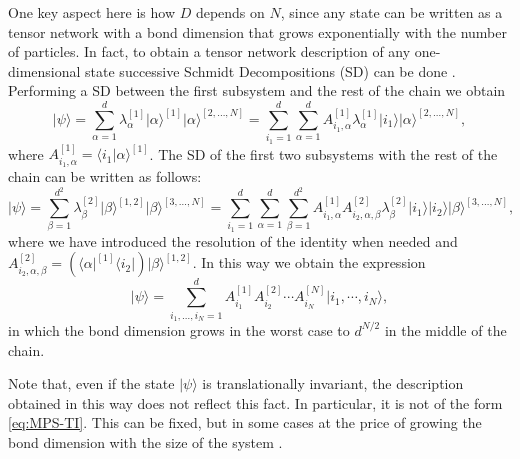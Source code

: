 \documentclass[smallextended]{svjour3}
\renewcommand{\1}{\mathbbm{1}}
\newcommand{\ket} [1] {\vert #1 \rangle}
\newcommand{\bra} [1] {\langle #1 \vert}
\begin{document}
One key aspect here is how $D$ depends on $N$, since any state can be written as a tensor network with a bond dimension that grows exponentially with the number of particles. In fact, to obtain a tensor network description of any one-dimensional state successive Schmidt  Decompositions (SD) can be done \cite{Vidal}. Performing a SD between the first subsystem and the rest of the chain we obtain
$$\ket{\psi}=\sum_{\alpha=1}^d \lambda^{[1]}_{\alpha} \ket{\alpha}^{[1]}\ket{\alpha}^{[2,\dots, N]}=\sum_{i_1=1}^d \sum_{\alpha=1}^d A^{[1]}_{i_1,\alpha}\lambda^{[1]}_{\alpha}\ket{i_1} \ket{\alpha}^{[2,\dots, N]},$$
where $A^{[1]}_{i_1,\alpha}= \langle i_1| \alpha\rangle^{[1]}$. The SD of the first two subsystems with the rest of the chain can be written as follows:
\begin{equation}\label{psiSD}\ket{\psi}=\sum_{\beta=1}^{d^2} \lambda^{[2]}_{\beta} \ket{\beta}^{[1,2]}\ket{\beta}^{[3,\dots, N]}=\sum_{i_1=1}^d \sum_{\alpha=1}^d \sum_{\beta=1}^{d^2}  A^{[1]}_{i_1,\alpha} A^{[2]}_{i_2,\alpha,\beta} \lambda^{[2]}_{\beta}\ket{i_1} \ket{i_2} \ket{\beta}^{[3,\dots, N]},
\end{equation}
where we have introduced the resolution of the identity when needed and $A^{[2]}_{i_2,\alpha,\beta}= (\bra{ \alpha}^{[1]}\bra{ i_2}) \ket{\beta}^{[1,2]}$. In this way we obtain the expression
\begin{equation}\label{MPS-OBC}
    \ket{\psi}= \sum^{d}_{i_1,\dots,i_N=1}A^{[1]}_{i_1}A^{[2]}_{i_2}\cdots A^{[N]}_{i_N} \ket{i_1,\cdots,i_N} ,
\end{equation}
in which the bond dimension grows in the worst case to $d^{N/2}$ in the middle of the chain.

Note that, even if the state $\ket{\psi}$ is translationally invariant, the description obtained in this way does not reflect this fact. In particular, it is not of the form \eqref{eq:MPS-TI}. This can be fixed, but in some cases at the price of growing the bond dimension with the size of the system \cite{qWielandt}.
\end{document}
